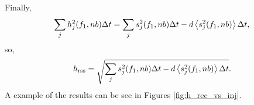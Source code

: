 \documentclass[10pt]{article}
\begin{document}
Finally,
\begin{equation}
\sum_{j} h_{j}^{2}(f_{1}, n b) \Delta t
   = \sum_{j} s_{j}^{2}(f_{1}, n b) \Delta t - d \left\langle s_{j}^{2}(f_{1}, n
   b)\right\rangle \Delta t,
\end{equation}
so,
\begin{equation}
h_{\text{rss}}
   = \sqrt{\sum_{j} s_{j}^{2}(f_{1}, n b) \Delta t - d
   \left\langle s_{j}^{2}(f_{1}, n b)\right\rangle \Delta t}.
\end{equation}
A example of the results can be see in Figures \ref{fig:h_rec_vs_inj}.
\begin{figure}
\begin{center}

\end{center}
\end{figure}
\end{document}
